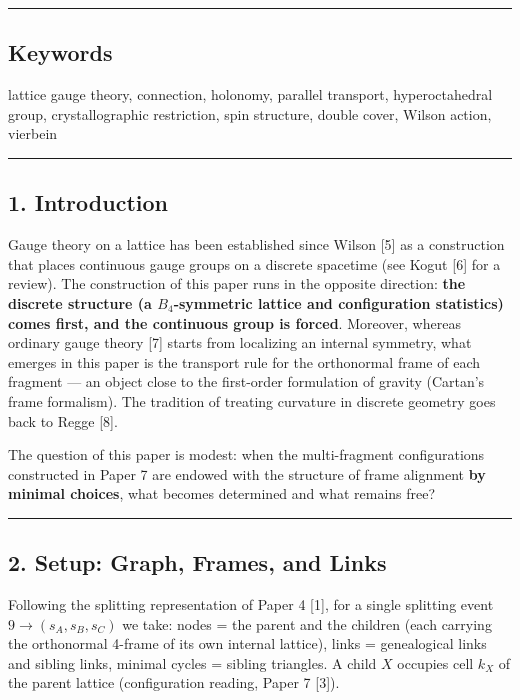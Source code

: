 \documentclass[
]{article}
\begin{document}
\begin{center}\rule{0.5\linewidth}{0.5pt}\end{center}

\subsection{Keywords}\label{keywords}

lattice gauge theory, connection, holonomy, parallel transport,
hyperoctahedral group, crystallographic restriction, spin structure,
double cover, Wilson action, vierbein

\begin{center}\rule{0.5\linewidth}{0.5pt}\end{center}

\subsection{1. Introduction}\label{introduction}

Gauge theory on a lattice has been established since Wilson {[}5{]} as a
construction that places continuous gauge groups on a discrete spacetime
(see Kogut {[}6{]} for a review). The construction of this paper runs in
the opposite direction: \textbf{the discrete structure (a
\(B_4\)-symmetric lattice and configuration statistics) comes first, and
the continuous group is forced}. Moreover, whereas ordinary gauge theory
{[}7{]} starts from localizing an internal symmetry, what emerges in
this paper is the transport rule for the orthonormal frame of each
fragment --- an object close to the first-order formulation of gravity
(Cartan's frame formalism). The tradition of treating curvature in
discrete geometry goes back to Regge {[}8{]}.

The question of this paper is modest: when the multi-fragment
configurations constructed in Paper 7 are endowed with the structure of
frame alignment \textbf{by minimal choices}, what becomes determined and
what remains free?

\begin{center}\rule{0.5\linewidth}{0.5pt}\end{center}

\subsection{2. Setup: Graph, Frames, and
Links}\label{setup-graph-frames-and-links}

Following the splitting representation of Paper 4 {[}1{]}, for a single
splitting event \(9\to(s_A,s_B,s_C)\) we take: nodes = the parent and
the children (each carrying the orthonormal 4-frame of its own internal
lattice), links = genealogical links and sibling links, minimal cycles =
sibling triangles. A child \(X\) occupies cell \(k_X\) of the parent
lattice (configuration reading, Paper 7 {[}3{]}).
\end{document}
